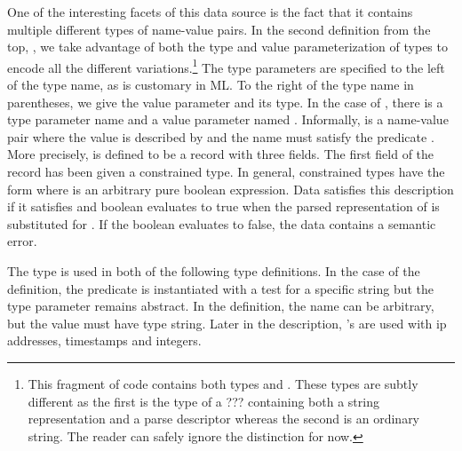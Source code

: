 One of the interesting facets of this data source is the fact that it
contains multiple different types of name-value pairs.  In the second
definition from the top, , we take advantage of both the type
and value parameterization of types to encode all the different
variations.\footnote{This fragment of code contains both types
   and .  These types are subtly different as
  the first is the type of a ??? containing both a string
  representation and a parse descriptor whereas the second is an
  ordinary string.  The reader can safely ignore the distinction for
  now.}  The type parameters are specified to the left of the type
name, as is customary in ML.  To the right of the type name in
parentheses, we give the value parameter and its type.  In the case of
, there is a type parameter name  and a value
parameter named .  Informally,  is a
name-value pair where the value is described by  and the
name must satisfy the predicate .  More precisely,  is
defined to be a record with three fields.  The first field of the
record has been given a constrained type.  In general, constrained
types have the form \cd{[x:T | e]} where  is an arbitrary pure
boolean expression.  Data  satisfies this description if it
satisfies  and boolean  evaluates to true when the parsed
representation of  is substituted for .  If the boolean
evaluates to false, the data contains a semantic error.

The  type is used in both of the following type definitions.
In the case of the  definition, the predicate is instantiated
with a test for a specific string but the type parameter remains 
abstract.  In the  
definition, the name can be arbitrary, but the value must have 
type string. Later in the description, 's
are used with ip addresses, timestamps and integers. 


